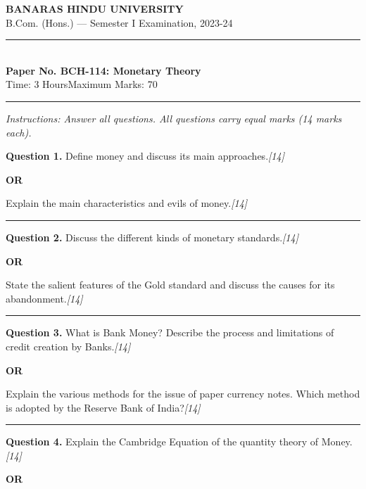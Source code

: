 \documentclass[11pt,a4paper]{article}
\newcommand{\pts}[1]{\hfill   \textit{[#1]}}
\begin{document}
\begin{center}
  {\large\bfseries BANARAS HINDU UNIVERSITY}\\[2pt]
  {\normalsize B.Com. (Hons.) --- Semester I Examination, 2023-24}\\[6pt]
  \rule{0.8\linewidth}{0.5pt}\\[6pt]
  {\large\bfseries Paper No. BCH-114: Monetary Theory}\\[4pt]
  {\normalsize Time: 3 Hours\hfill Maximum Marks: 70}
\end{center}

\rule{\linewidth}{0.4pt}

\smallskip



\noindent   \textit{Instructions: Answer all questions. All questions carry equal marks (14 marks each).}

\bigskip




\noindent   \textbf{Question 1.}
Define money and discuss its main approaches.\pts{14}

\centerline{   \textbf{OR}}

Explain the main characteristics and evils of money.\pts{14}

\medskip\rule{\linewidth}{0.2pt}




\noindent   \textbf{Question 2.}
Discuss the different kinds of monetary standards.\pts{14}

\centerline{   \textbf{OR}}

State the salient features of the Gold standard and discuss the causes for its abandonment.\pts{14}

\medskip\rule{\linewidth}{0.2pt}




\noindent   \textbf{Question 3.}
What is Bank Money? Describe the process and limitations of credit creation by Banks.\pts{14}

\centerline{   \textbf{OR}}

Explain the various methods for the issue of paper currency notes. Which method is adopted by the Reserve Bank of India?\pts{14}

\medskip\rule{\linewidth}{0.2pt}




\noindent   \textbf{Question 4.}
Explain the Cambridge Equation of the quantity theory of Money.\pts{14}

\centerline{   \textbf{OR}}
\end{document}

